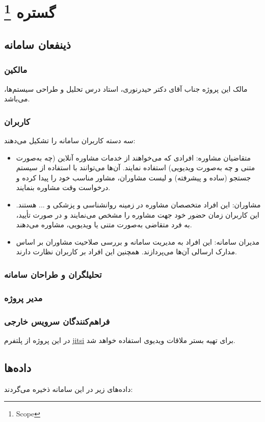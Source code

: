 \section{گستره \footnote{Scope} }
\subsection{ذینفعان سامانه}
\subsubsection{مالکین}
مالک این پروژه جناب آقای دکتر حیدرنوری، استاد درس تحلیل و طراحی سیستم‌ها، می‌باشد. 

\subsubsection{کاربران}
سه دسته کاربران سامانه را تشکیل می‌دهند:
\begin{itemize}
\item متقاضیان مشاوره: افرادی که می‌خواهند از خدمات مشاوره آنلاین (چه به‌صورت متنی و چه به‌صورت ویدیویی) استفاده نمایند. آن‌ها می‌توانند با استفاده از سیستم جستجو (ساده و پیشرفته) و لیست مشاوران، مشاور مناسب خود را پیدا کرده و درخواست وقت مشاوره بنمایند.
\item مشاوران: این افراد متخصصان مشاوره در زمینه روانشناسی و پزشکی و ... هستند. این کاربران زمان حضور خود جهت مشاوره را مشخص می‌نمایند و در صورت تأیید، به فرد متقاضی به‌صورت متنی یا ویدیویی، مشاوره می‌دهند. 
\item مدیران سامانه: این افراد به مدیریت سامانه و بررسی صلاحیت مشاوران بر اساس مدارک ارسالی آن‌ها می‌پردازند. همچنین این افراد بر کاربران نظارت دارند.
\end{itemize}
\subsubsection{تحلیلگران و طراحان سامانه}

\subsubsection{مدیر پروژه}

\subsubsection{فراهم‌کنندگان سرویس خارجی}
در این پروژه از پلتفرم \href{https://meet.jit.si/}{jitsi} برای تهیه بستر ملاقات ویدیوی استفاده خواهد شد.

\subsection{داده‌ها}
داده‌های زیر در این سامانه ذخیره می‌گردند:


